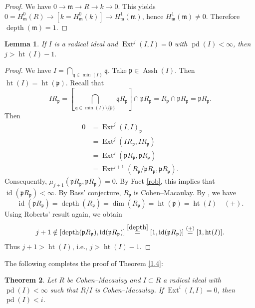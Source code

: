 \documentclass[11.05pt,a4paper]{amsart}
\newtheorem{theorem}{Theorem}[section]
\newtheorem{lemma}[theorem]{Lemma}
\theoremstyle{definition}
\theoremstyle{remark}
\newcommand{\id}{\operatorname{id}}
\newcommand{\pd}{\operatorname{pd}}
\newcommand{\Ext}{\operatorname{Ext}}
\newcommand{\depth}{\operatorname{depth}}
\begin{document}
\begin{proof}
	We have $0\to \mathfrak{m}\to R\to k\to 0$. This yields
	$0=H^0_{\mathfrak{m}}(R)\to [k=H^0_{\mathfrak{m}}(k)]\to H^1_{\mathfrak{m}}(\mathfrak{m})$,
	hence $H^1_{\mathfrak{m}}(\mathfrak{m})\neq 0$. Therefore $\depth(\mathfrak{m}) =1$.
\end{proof}

\begin{lemma}\label{118}
	If $I$ is a radical ideal and $\Ext^j(I,I) = 0$ with $\pd(I) < \infty$, then
	\(
	j > \operatorname{ht}(I) - 1.
	\)
\end{lemma}

\begin{proof}
	We have $I  = \bigcap_{\mathfrak{q}\in\min(I)} \mathfrak{q}$. Take $\mathfrak{p} \in \operatorname{Assh}(I)$. 
	Then $\operatorname{ht}(I)=\operatorname{ht}(\mathfrak{p})$.
Recall that
	\[
	IR_\mathfrak{p} = [\bigcap_{\mathfrak{q}\in\min(I)\setminus\{\mathfrak{p}\}}  \mathfrak{q}R_\mathfrak{p}]  \cap  \mathfrak{p} R_\mathfrak{p} = R_\mathfrak{p} \cap \mathfrak{p} R_\mathfrak{p}
	=\mathfrak{p} R_\mathfrak{p}.
	\]
Then
	\begin{align*}
	0
	&= \Ext^j(I,I)_\mathfrak{p}   \\
	&= \Ext^j(IR_\mathfrak{p}, I R_\mathfrak{p})  \\
	&= \Ext^j(\mathfrak{p} R_\mathfrak{p}, \mathfrak{p} R_\mathfrak{p}) \\
	&= \Ext^{j+1}(R_\mathfrak{p}/\mathfrak{p} R_\mathfrak{p}, \mathfrak{p} R_\mathfrak{p}) .
	\end{align*}
Consequently, $\mu_{j+1}(\mathfrak{p} R_\mathfrak{p}, \mathfrak{p} R_\mathfrak{p}) = 0$.
	By Fact \ref{rob}, this implies that $\id(\mathfrak{p} R_\mathfrak{p})<\infty$. By Bass' conjecture, $R_\mathfrak{p}$ is Cohen–Macaulay. By \cite[3.1.17]{BH}, we have 
	\[
	\id(\mathfrak{p} R_\mathfrak{p})=\depth(R_\mathfrak{p})=\dim(R_\mathfrak{p})=\operatorname{ht}(\mathfrak{p})=\operatorname{ht}(I)\quad(+).
	\]
Using Roberts' result again, we obtain
	\[
	j+1 \notin [\depth(\mathfrak{p} R_\mathfrak{p}), \id(\mathfrak{p} R_\mathfrak{p})]
	\stackrel{\ref{depth}}{=} [1, \id(\mathfrak{p} R_\mathfrak{p})]
	\stackrel{(+)}{=} [1, \operatorname{ht}(I)].
	\]
	Thus $j+1 > \operatorname{ht}(I)$, i.e., $j > \operatorname{ht}(I)-1$.
\end{proof}

The following completes the proof of Theorem \ref{1.4}:

\begin{theorem}
	Let $R$ be Cohen–Macaulay and $I \subset R$ a radical ideal with $\pd(I) < \infty$ such that $R/I$ is Cohen–Macaulay. If $\Ext^i(I,I) = 0$, then $\pd(I) < i$.
\end{theorem}
\end{document}
